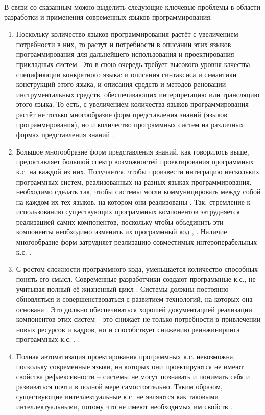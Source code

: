 В связи со сказанным можно выделить следующие ключевые проблемы в области разработки и применения современных языков программирования:
\begin{enumerate}
    \item Поскольку количество языков программирования растёт с увеличением потребности в них, то растут и потребности в описании этих языков программирования для дальнейшего использования и проектирования прикладных систем. Это в свою очередь требует высокого уровня качества спецификации конкретного языка: и описания синтаксиса и семантики конструкций этого языка, и описания средств и методов реновации инструментальных средств, обеспечивающих интерпретацию или трансляцию этого языка. То есть, с увеличением количества языков программирования растёт не только многообразие форм представления знаний (языков программирования), но и количество программных систем на различных формах представления знаний \cite{Zapata2010}.
    \item Большое многообразие форм представления знаний, как говорилось выше, предоставляет большой спектр возможностей проектирования программных к.с. на каждой из них. Получается, чтобы произвести интеграцию нескольких программных систем, реализованных на разных языках программирования, необходимо сделать так, чтобы системы могли коммуницировать между собой на каждом их тех языков, на котором они реализованы \cite{Golenkov2019a}. Так, стремление к использованию существующих программных компонентов затрудняется реализацией самих компонентов, поскольку чтобы объединить эти компоненты необходимо изменить их программный код \cite{Penta2020}, \cite{Scalabrino2016}. Наличие многообразие форм затрудняет реализацию совместимых интероперабельных к.с. \cite{Golenkov2012}.
    \item С ростом сложности программного кода, уменьшается количество способных понять его смысл. Современные разработчики создают программные к.с., не учитывая полный её жизненный цикл \cite{Brooks2021}. Системы должны постоянно обновляться и совершенствоваться с развитием технологий, на которых она основана \cite{Sellitto2022}. Это должно обеспечиваться хорошей документацией реализации компонентов этих систем -- это снижает не только потребности в привлечении новых ресурсов и кадров, но и способствует снижению реинжиниринга программных к.с. \cite{Penta2020}, \cite{Scalabrino2016}.
    \item Полная автоматизация проектирования программных к.с. невозможна, поскольку современные языки, на которых они проектируются не имеют свойства рефлексивности -- системы не могут познавать и понимать себя и развиваться почти в полной мере самостоятельно. Таким образом, существующие интеллектуальные к.с. не являются как таковыми интеллектуальными, потому что не имеют необходимых им свойств \cite{GolenkovPrinciples2021}.

\end{enumerate}
